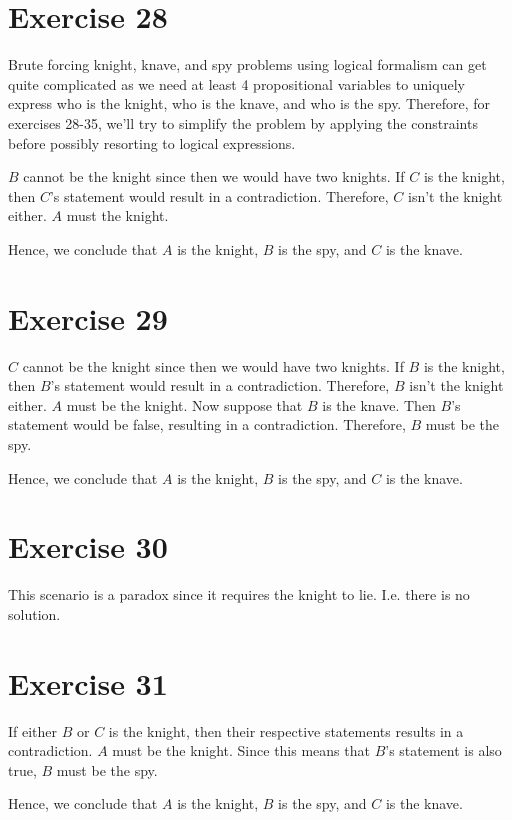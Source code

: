 \documentclass{article}
\begin{document}
\pagebreak

\section{Exercise 28}
Brute forcing knight, knave, and spy problems using logical formalism can get quite complicated as we need at least 4 propositional variables to uniquely express who is the knight, who is the knave, and who is the spy. Therefore, for exercises 28-35, we'll try to simplify the problem by applying the constraints before possibly resorting to logical expressions.

$B$ cannot be the knight since then we would have two knights.  If $C$ is the knight, then $C$'s statement would result in a contradiction.  Therefore, $C$ isn't the knight either. $A$ must the knight.

Hence, we conclude that $A$ is the knight, $B$ is the spy, and $C$ is the knave.

\pagebreak

\section{Exercise 29}
$C$ cannot be the knight since then we would have two knights.  If $B$ is the knight, then $B$'s statement would result in a contradiction. Therefore, $B$ isn't the knight either. $A$ must be the knight.
Now suppose that $B$ is the knave. Then $B$'s statement would be false, resulting in a contradiction. Therefore, $B$ must be the spy.

Hence, we conclude that $A$ is the knight, $B$ is the spy, and $C$ is the knave.

\pagebreak

\section{Exercise 30}
This scenario is a paradox since it requires the knight to lie. I.e. there is no solution.

\pagebreak

\section{Exercise 31}
If either $B$ or $C$ is the knight, then their respective statements results in a contradiction. $A$ must be the knight. Since this means that $B$'s statement is also true, $B$ must be the spy.

Hence, we conclude that $A$ is the knight, $B$ is the spy, and $C$ is the knave.
\end{document}
